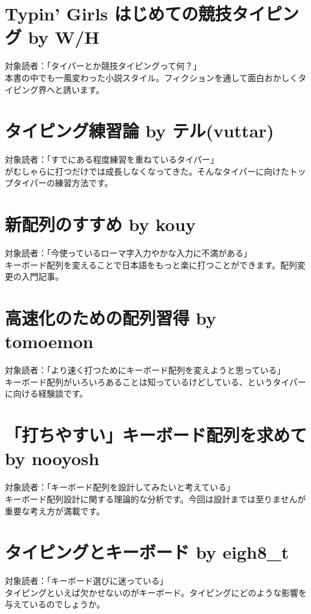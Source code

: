 \section*{Typin' Girls はじめての競技タイピング \small{by W/H}}
\noindent 対象読者：「タイパーとか競技タイピングって何？」\\
本書の中でも一風変わった小説スタイル。フィクションを通して面白おかしくタイピング界へと誘います。

\section*{タイピング練習論 \small{by テル(vuttar)}}
\noindent 対象読者：「すでにある程度練習を重ねているタイパー」\\
がむしゃらに打つだけでは成長しなくなってきた。そんなタイパーに向けたトップタイパーの練習方法です。

\section*{新配列のすすめ \small{by kouy}}
\noindent 対象読者：「今使っているローマ字入力やかな入力に不満がある」\\
キーボード配列を変えることで日本語をもっと楽に打つことができます。配列変更の入門記事。

\section*{高速化のための配列習得 \small{by tomoemon}}
\noindent 対象読者：「より速く打つためにキーボード配列を変えようと思っている」\\
キーボード配列がいろいろあることは知っているけどしている、というタイパーに向ける経験談です。

\section*{「打ちやすい」キーボード配列を求めて \small{by nooyosh}}
\noindent 対象読者：「キーボード配列を設計してみたいと考えている」\\
キーボード配列設計に関する理論的な分析です。今回は設計までは至りませんが重要な考え方が満載です。

\section*{タイピングとキーボード \small{by eigh8\_t}}
\noindent 対象読者：「キーボード選びに迷っている」\\
タイピングといえば欠かせないのがキーボード。タイピングにどのような影響を与えているのでしょうか。


